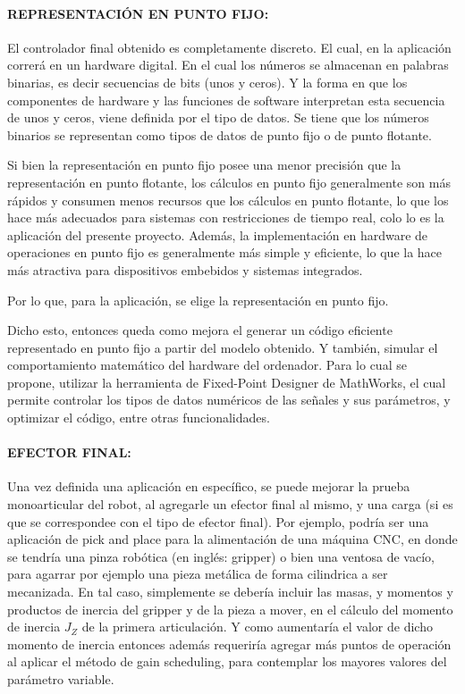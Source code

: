 \documentclass{article}
\begin{document}
\begin{sloppypar}
\paragraph{REPRESENTACIÓN EN PUNTO FIJO:}
\label{sec:REPRESENTACIÓN EN PUNTO FIJO:}
\hfill

El controlador final obtenido es completamente discreto. El cual, en la aplicación correrá en un hardware digital. En el cual los números se almacenan en palabras binarias, es decir secuencias de bits (unos y ceros). Y la forma en que los componentes de hardware y las funciones de software interpretan esta secuencia de unos y ceros, viene definida por el tipo de datos. Se tiene que los números binarios se representan como tipos de datos de punto fijo o de punto flotante.

Si bien la representación en punto fijo posee una menor precisión que la representación en punto flotante, los cálculos en punto fijo generalmente son más rápidos y consumen menos recursos que los cálculos en punto flotante, lo que los hace más adecuados para sistemas con restricciones de tiempo real, colo lo es la aplicación del presente proyecto. Además, la implementación en hardware de operaciones en punto fijo es generalmente más simple y eficiente, lo que la hace más atractiva para dispositivos embebidos y sistemas integrados.

Por lo que, para la aplicación, se elige la representación en punto fijo.

Dicho esto, entonces queda como mejora el generar un código eficiente representado en punto fijo a partir del modelo obtenido. Y también, simular el comportamiento matemático del hardware del ordenador. Para lo cual se propone, utilizar la herramienta de Fixed-Point Designer de MathWorks, el cual permite controlar los tipos de datos numéricos de las señales y sus parámetros, y optimizar el código, entre otras funcionalidades.


\paragraph{EFECTOR FINAL:}
\label{sec:EFECTOR FINAL:}
\hfill

Una vez definida una aplicación en específico, se puede mejorar la prueba monoarticular del robot, al agregarle un efector final al mismo, y una carga (si es que se correspondee con el tipo de efector final). Por ejemplo, podría ser una aplicación de pick and place para la alimentación de una máquina CNC, en donde se tendría una pinza robótica (en inglés: gripper) o bien una ventosa de vacío, para agarrar por ejemplo una pieza metálica de forma cilindrica a ser mecanizada. En tal caso, simplemente se debería incluir las masas, y momentos y productos de inercia del gripper y de la pieza a mover, en el cálculo del momento de inercia $J_Z$ de la primera articulación. Y como aumentaría el valor de dicho momento de inercia entonces además requeriría agregar más puntos de operación al aplicar el método de gain scheduling, para contemplar los mayores valores del parámetro variable.



\end{sloppypar}
\end{document}
